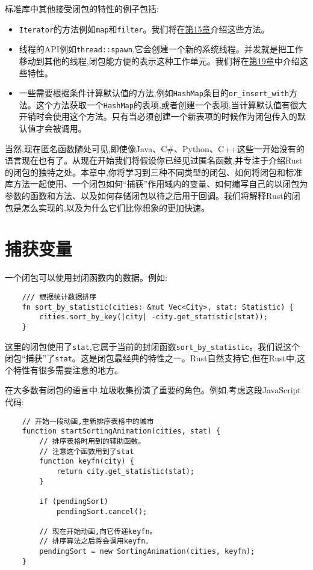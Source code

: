标准库中其他接受闭包的特性的例子包括:
\begin{itemize}
    \item \texttt{Iterator}的方法例如\texttt{map}和\texttt{filter}。我们将在\hyperref[ch15]{第15章}介绍这些方法。
    \item 线程的API例如\texttt{thread::spawn},它会创建一个新的系统线程。并发就是把工作移动到其他的线程,闭包能方便的表示这种工作单元。我们将在\hyperref[ch19]{第19章}中介绍这些特性。
    \item 一些需要根据条件计算默认值的方法,例如\texttt{HashMap}条目的\texttt{or\_insert\_with}方法。这个方法获取一个\texttt{HashMap}的表项,或者创建一个表项,当计算默认值有很大开销时会使用这个方法。只有当必须创建一个新表项的时候作为闭包传入的默认值才会被调用。
\end{itemize}

当然,现在匿名函数随处可见,即使像Java、C\#、Python、C++这些一开始没有的语言现在也有了。从现在开始我们将假设你已经见过匿名函数,并专注于介绍Rust的闭包的独特之处。本章中,你将学习到三种不同类型的闭包、如何将闭包和标准库方法一起使用、一个闭包如何“捕获”作用域内的变量、如何编写自己的以闭包为参数的函数和方法、以及如何存储闭包以待之后用于回调。我们将解释Rust的闭包是怎么实现的,以及为什么它们比你想象的更加快速。

\section{捕获变量}
一个闭包可以使用封闭函数内的数据。例如:
\begin{verbatim}
    /// 根据统计数据排序
    fn sort_by_statistic(cities: &mut Vec<City>, stat: Statistic) {
        cities.sort_by_key(|city| -city.get_statistic(stat));
    }
\end{verbatim}

这里的闭包使用了\texttt{stat},它属于当前的封闭函数\texttt{sort\_by\_statistic}。我们说这个闭包“捕获”了\texttt{stat}。这是闭包最经典的特性之一。Rust自然支持它,但在Rust中,这个特性有很多需要注意的地方。

在大多数有闭包的语言中,垃圾收集扮演了重要的角色。例如,考虑这段JavaScript代码:
\begin{verbatim}
    // 开始一段动画,重新排序表格中的城市
    function startSortingAnimation(cities, stat) {
        // 排序表格时用到的辅助函数。
        // 注意这个函数用到了stat
        function keyfn(city) {
            return city.get_statistic(stat);
        }

        if (pendingSort)
            pendingSort.cancel();

        // 现在开始动画,向它传递keyfn。
        // 排序算法之后将会调用keyfn。
        pendingSort = new SortingAnimation(cities, keyfn);
    }
\end{verbatim}

